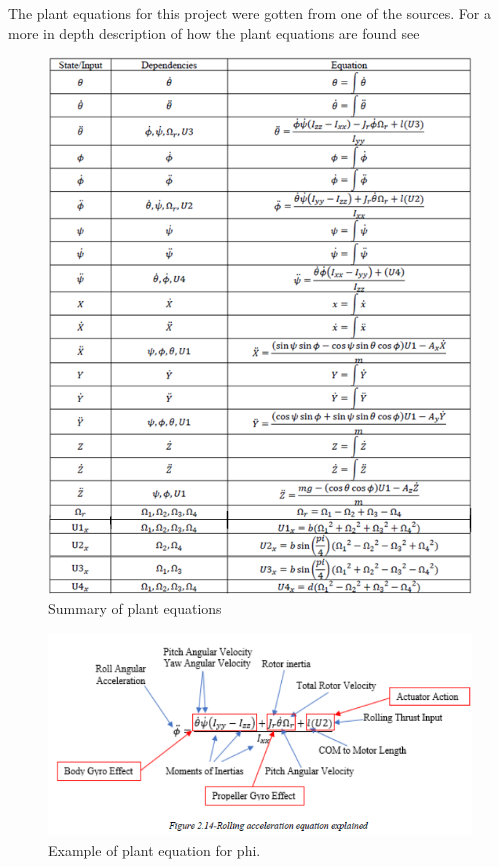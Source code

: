 The plant equations for this project were gotten from one of the sources. For a more in depth description of how the plant equations are found see \cite{Ferry}
\begin{figure}[H]
\begin{center}
   \includegraphics[scale =1]{pictures/control/plant equations.png}
\end{center}
\caption{Summary of plant equations \cite{Ferry}}
\end{figure}

\begin{figure}[H]
\begin{center}
   \includegraphics[scale =1]{pictures/control/plant equation example.png}
\end{center}
\caption{Example of plant equation for phi. \cite{Ferry}}
\end{figure}

